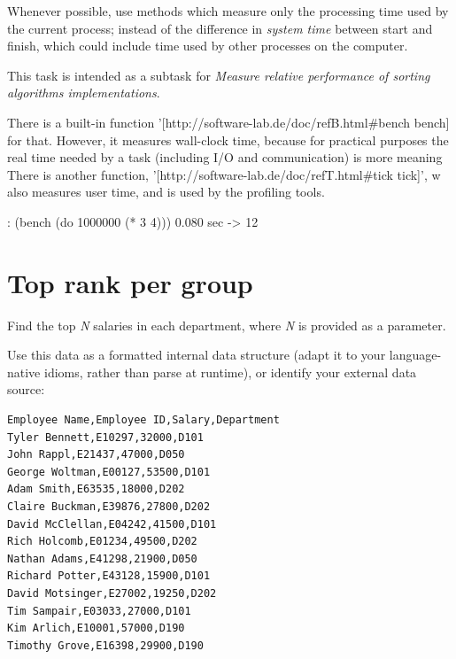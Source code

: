 Whenever possible, use methods which measure only the processing time
used by the current process; instead of the difference in
\emph{system time} between start and finish, which
could include time used by other processes on the computer.

This task is intended as a subtask for \emph{Measure relative
  performance of sorting algorithms implementations}.


\begin{wideverbatim}

There is a built-in function '[http://software-lab.de/doc/refB.html#bench bench]
for that. However, it measures wall-clock time, because for practical purposes
the real time needed by a task (including I/O and communication) is more meaning
There is another function, '[http://software-lab.de/doc/refT.html#tick tick]', w
also measures user time, and is used by the profiling tools.

: (bench (do 1000000 (* 3 4)))
0.080 sec
-> 12

\end{wideverbatim}







\pagebreak{}
\section*{Top rank per group}

Find the top \emph{N} salaries in each department, where \emph{N} is
provided as a parameter.

Use this data as a formatted internal data structure (adapt it to your
language-native idioms, rather than parse at runtime), or identify your
external data source:

\begin{verbatim}
Employee Name,Employee ID,Salary,Department
Tyler Bennett,E10297,32000,D101
John Rappl,E21437,47000,D050
George Woltman,E00127,53500,D101
Adam Smith,E63535,18000,D202
Claire Buckman,E39876,27800,D202
David McClellan,E04242,41500,D101
Rich Holcomb,E01234,49500,D202
Nathan Adams,E41298,21900,D050
Richard Potter,E43128,15900,D101
David Motsinger,E27002,19250,D202
Tim Sampair,E03033,27000,D101
Kim Arlich,E10001,57000,D190
Timothy Grove,E16398,29900,D190
\end{verbatim}



